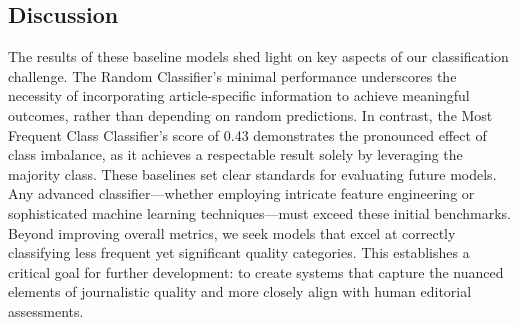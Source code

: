 

\subsection{Discussion}
The results of these baseline models shed light on key aspects of our classification challenge. The Random Classifier's minimal performance underscores the necessity of incorporating article-specific information to achieve meaningful outcomes, rather than depending on random predictions. In contrast, the Most Frequent Class Classifier's score of 0.43 demonstrates the pronounced effect of class imbalance, as it achieves a respectable result solely by leveraging the majority class.
These baselines set clear standards for evaluating future models. Any advanced classifier—whether employing intricate feature engineering or sophisticated machine learning techniques—must exceed these initial benchmarks. Beyond improving overall metrics, we seek models that excel at correctly classifying less frequent yet significant quality categories. This establishes a critical goal for further development: to create systems that capture the nuanced elements of journalistic quality and more closely align with human editorial assessments.

